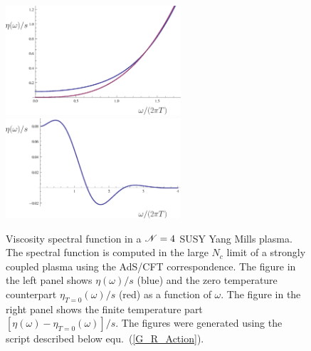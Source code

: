 \begin{figure}[t!]
\begin{center}
\includegraphics*[width=6.5cm]{Chapter2-figures/AdS5_Schwarz_eta_w_txt.eps}
\includegraphics*[width=6.5cm]{Chapter2-figures/AdS5_Schwarz_eta_w_subtr_txt.eps}
\end{center}
\caption{\label{fig_ads_spec_fct}
Viscosity spectral function in a ${\cal N}=4$ SUSY Yang Mills plasma. 
The spectral function is computed in the large $N_c$ limit of a strongly 
coupled plasma using the AdS/CFT correspondence. The figure in the left 
panel shows $\eta(\omega)/s$ (blue) and the zero temperature counterpart 
$\eta_{T=0}(\omega)/s$ (red) as a function of $\omega$. The figure in the 
right panel shows the finite temperature part $[\eta(\omega)-\eta_{T=0}
(\omega)]/s$. The figures were generated using the script described 
below equ.~(\ref{G_R_Action}).}
\end{figure}

